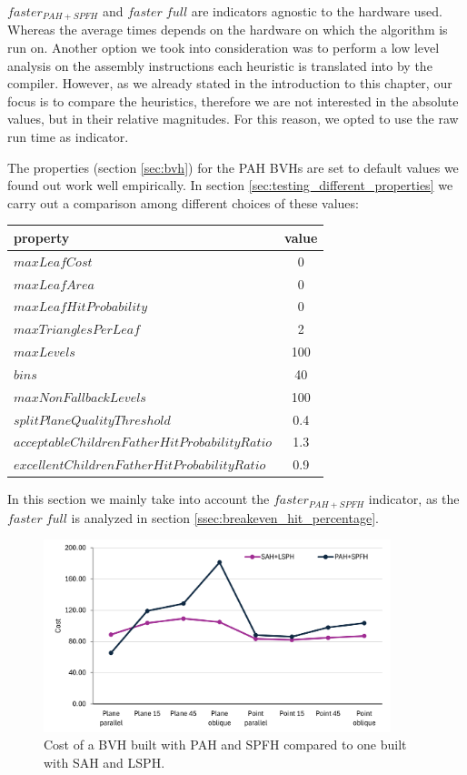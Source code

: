 \documentclass{PoliMi_MasterThesis}
\begin{document}
$faster_{PAH+SPFH}$ and $faster \; full$ are indicators agnostic to the hardware used. Whereas the average times depends on the hardware on which the algorithm is run on. Another option we took into consideration was to perform a low level analysis on the assembly instructions each heuristic is translated into by the compiler. However, as we already stated in the introduction to this chapter, our focus is to compare the heuristics, therefore we are not interested in the absolute values, but in their relative magnitudes. For this reason, we opted to use the raw run time as indicator.

The properties (section \ref{sec:bvh}) for the PAH BVHs are set to default values we found out work well empirically. In section \ref{sec:testing_different_properties} we carry out a comparison among different choices of these values:

\begin{table}[H]
	\centering
	\begin{tabular}{| l | c |}
		\hline
		\textbf{property} & \textbf{value}\\
		\hline
		\hline
		$maxLeafCost$ & 0\\
		$maxLeafArea$ & 0\\
		$maxLeafHitProbability$ & 0\\
		$maxTrianglesPerLeaf$ & 2\\
		$maxLevels$ & 100\\
		$bins$ & 40\\
		$maxNonFallbackLevels$ & 100\\
		$splitPlaneQualityThreshold$ & 0.4\\
		$acceptableChildrenFatherHitProbabilityRatio$ & 1.3\\
		$excellentChildrenFatherHitProbabilityRatio$ & 0.9\\
		\hline
	\end{tabular}
	\label{tab:standard_properties}
\end{table}

In this section we mainly take into account the $faster_{PAH+SPFH}$ indicator, as the $faster \; full$ is analyzed in section \ref{ssec:breakeven_hit_percentage}.

\begin{figure}[H] 
	\centering
	\includegraphics[width=0.9\textwidth]{Images/pah_without_fallback_faster_chart.png}
	\caption{Cost of a BVH built with PAH and SPFH compared to one built with SAH and LSPH.}
	\label{fig:pah_without_fallback_faster_chart}
\end{figure}
\end{document}
